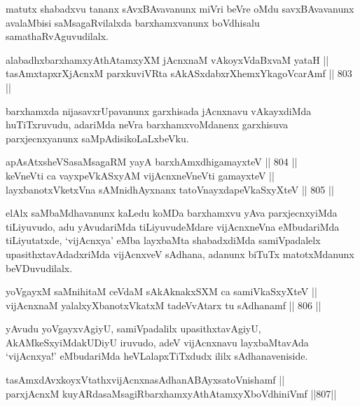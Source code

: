 \begin{artha}
matutx shabadxvu tananx sAvxBAvavanunx miVri beVre oMdu savxBAvavanunx avalaMbisi saMsagaRvilalxda barxhamxvanunx boVdhisalu samathaRvAgu\-vudilalx.
\end{artha}

\begin{shl}
alabadhxbarxhamxyAthAtamxyXM jAcnxnaM vAkoyxVdaBxvaM yataH || \\
tasAmxtapxrXjAcnxM parxkuviVRta sAkASxdabxrXhemxYkagoVcarAmf \hfill || 803 ||  
\end{shl}

\begin{artha}
barxhamxda nijasavxrUpavanunx garxhisada jAcnxnavu vAkayxdiMda huTiTxru\-vudu, adariMda neVra barxhamxvoMdanenx garxhisuva parxjecnxyanunx saMpAdisikoLaLxbeVku.
\end{artha}


\begin{shl}
apAsAtxsheVSasaMsagaRM yayA barxhAmxdhigamayxteV \hfill || 804 ||  \\
keVneVti ca vayxpeVkASxyAM vijAcnxneVneVti gamayxteV || \\
layxbanotxVketxVna sAMnidhAyxnanx tatoV\s nayxdapeVkaSxyXteV \hfill || 805 ||  
\end{shl}

\begin{artha}
elAlx saMbaMdhavanunx kaLedu koMDa barxhamxvu yAva parxjecnxyiMda tiLiyuvudo, adu yAvudariMda tiLiyuvudeMdare vijAcnxneVna eMbudariMda tiLiyutatxde, `vijAcnxya' eMba layxbaMta shabadxdiMda samiVpadalelx upasithxtavAdadxriMda vijAcnxveV sAdhana, adanunx biTuTx matotxMdanunx beVDuvudilalx.
\end{artha}

\begin{shl}
yoVgayxM saMnihitaM ceVdaM sAkAknakxSXM ca samiVkaSxyXteV ||  \\
vijAcnxnaM yalalxyXbanotxVkatxM tadeVvAtarx tu sAdhanamf \hfill || 806 ||  
\end{shl}

\begin{artha}
yAvudu yoVgayxvAgiyU, samiVpadalilx upasithxtavAgiyU, AkAMkeSxyiMdakUDiyU iruvudo, adeV vijAcnxnavu layxbaMtavAda `vijAcnxya!' eMbudariMda heVLalapxTiTxdudx ililx sAdhanaveniside.
\end{artha}

\begin{shl}
tasAmxdAvxkoyxVtathxvijAcnxnasAdhanABAyxsatoV\s nishamf || \\
parxjAcnxM kuyARdasaMsagiRbarxhamxyAthAtamxyXboVdhiniVmf \hfill ||807||  
\end{shl}

